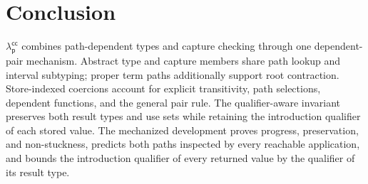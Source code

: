 \documentclass[acmsmall,screen,nonacm]{acmart}
\newcommand{\lambdapcc}{\ensuremath{\lambda_{\mathsf p}^{\mathsf{cc}}}}
\begin{document}
\section{Conclusion}

\lambdapcc{} combines path-dependent types and capture checking through one
dependent-pair mechanism.  Abstract type and capture members share path
lookup and interval subtyping; proper term paths additionally support root
contraction.  Store-indexed coercions account for explicit transitivity,
path selections, dependent functions, and the general pair rule.  The
qualifier-aware invariant preserves both result types and use sets while
retaining the introduction qualifier of each stored value.  The mechanized
development proves progress, preservation, and non-stuckness, predicts both
paths inspected by every reachable application, and bounds the introduction
qualifier of every returned value by the qualifier of its result type.



\end{document}

